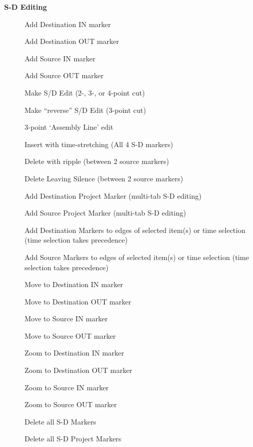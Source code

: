 \documentclass[10pt,american]{article}
\begin{document}
\textbf{S-D Editing}
\begin{description}
\item [{}] Add Destination IN marker 
\item [{}] Add Destination OUT marker 
\item [{}] Add Source IN marker 
\item [{}] Add Source OUT marker 
\item [{}] Make S/D Edit (2-, 3-, or 4-point cut)
\item [{}] Make ``reverse'' S/D Edit (3-point cut)
\item [{}] 3-point `Assembly Line' edit
\item [{}] Insert with time-stretching (All 4 S-D markers)
\item [{\keys{\backspace}}] Delete with ripple (between 2 source markers) 
\item [{\keys{\ctrl+\backspace}}] Delete Leaving Silence (between 2 source
markers) 
\item [{}] Add Destination Project Marker (multi-tab S-D
editing)
\item [{}] Add Source Project Marker (multi-tab S-D editing)
\item [{}] Add Destination Markers to edges of selected item(s)
or time selection (time selection takes precedence)
\item [{}] Add Source Markers to edges of selected item(s) or time
selection (time selection takes precedence)
\item [{}] Move to Destination IN marker
\item [{}] Move to Destination OUT marker
\item [{}] Move to Source IN marker
\item [{}] Move to Source OUT marker
\item [{}] Zoom to Destination IN marker
\item [{}] Zoom to Destination OUT marker
\item [{}] Zoom to Source IN marker
\item [{}] Zoom to Source OUT marker
\item [{\keys{\ctrl+\del}}] Delete all S-D Markers 
\item [{\keys{\shift+\del}}] Delete all S-D Project Markers 
\end{description}
\end{document}

